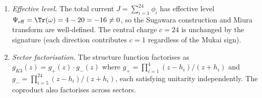 \begin{proposition}
\begin{enumerate}[label=\textup{(\roman*)}]
\item \emph{Effective level.}
The total current $J = \sum_{i=1}^{24} \phi_i$ has effective level
$\Psi_{\mathrm{eff}} = \Tr(\omega) = 4 - 20 = -16 \neq 0$, so the
Sugawara construction and Miura transform are well-defined.
The central charge $c = 24$ is unchanged by the signature (each
direction contributes $c = 1$ regardless of the Mukai sign).

\item \emph{Sector factorisation.}
The structure function factorises as $g_{K3}(z) = g_+(z) \cdot g_-(z)$
where $g_+ = \prod_{i=1}^{4}(z-h_i)/(z+h_i)$ and
$g_- = \prod_{i=5}^{24}(z-h_i)/(z+h_i)$, each satisfying unitarity
independently.  The coproduct also factorises across sectors.
\end{enumerate}
\end{proposition}

